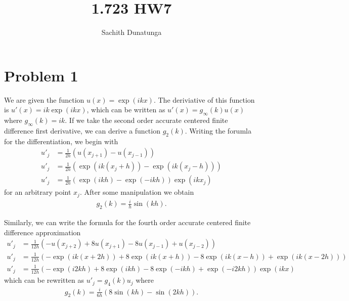 \documentclass{article}
\title{1.723 HW7}
\author{Sachith  Dunatunga}
\begin{document}
\newcommand{\deriv}[2]{\frac{\partial #1}{ \partial #2}}
\newcommand{\nderiv}[3]{\frac{\partial^{#3} #1}{ \partial #2^{#3}}}
\newcommand{\dx}[1]{\deriv{#1}{x}}
\newcommand{\taylorexpf}[3]{#1_{#2} + \left(#3 \right) \dx{#1}\biggr\rvert_{#2} + \frac{1}{2}\left(#3 \right)^2 \nderiv{#1}{x}{2}\biggr\rvert_{#2} + \frac{1}{6}\left(#3 \right)^3\nderiv{#1}{x}{3}\biggr\rvert_{#2} + \frac{1}{24}\left(#3 \right)^4\nderiv{#1}{x}{4}\biggr\rvert_{#2} + O(h^5)}
\maketitle

\section{Problem 1}
We are given the function $u(x) = \exp(ikx)$.
The deriviative of this function is $u'(x) = ik \exp(ikx)$, which can be written as $u'(x) = g_\infty(k) u(x)$ where $g_\infty(k) = ik$.
If we take the second order accurate centered finite difference first derivative, we can derive a function $g_2(k)$.
Writing the forumla for the differentiation, we begin with
\begin{align}
    u'_j &= \frac{1}{2h} \left( u(x_{j+1}) - u(x_{j-1}) \right) \\
    u'_j &= \frac{1}{2h} \left( \exp(ik(x_j + h)) - \exp(ik(x_j - h))\right) \\
    u'_j &= \frac{1}{2h} \left( \exp(ikh) - \exp(-ikh)\right) \exp(ikx_j)
\end{align}
for an arbitrary point $x_j$.
After some manipulation we obtain
\begin{align}
    g_2(k) = \frac{i}{h}\sin(kh).
\end{align}

Similarly, we can write the formula for the fourth order accurate centered finite difference approximation
\begin{align}
    u'_j &= \frac{1}{12h} \left( -u(x_{j+2}) + 8u(x_{j+1}) - 8u(x_{j-1}) + u(x_{j-2}) \right) \\
    u'_j &= \frac{1}{12h} \left( -\exp(ik(x+2h)) + 8\exp(ik(x+h)) - 8\exp(ik(x-h)) + \exp(ik(x-2h)) \right) \\
    u'_j &= \frac{1}{12h} \left( -\exp(i2kh) + 8\exp(ikh) - 8\exp(-ikh) + \exp(-i2kh) \right) \exp(ikx)
\end{align}
which can be rewritten as $u'_j = g_4(k) u_j$ where
\begin{align}
    g_2(k) = \frac{i}{6h}\left( 8\sin(kh) - \sin(2kh) \right).
\end{align}
\end{document}
